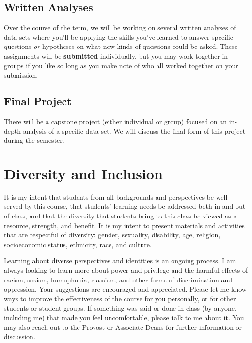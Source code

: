 \documentclass[
]{book}
\begin{document}
\hypertarget{written-analyses}{%
\subsection*{Written Analyses}\label{written-analyses}}

Over the course of the term, we will be working on several written analyses of data sets where you'll be applying the skills you've learned to answer specific questions \emph{or} hypotheses on what new kinds of questions could be asked. These assignments will be \textbf{submitted} individually, but you may work together in groups if you like so long as you make note of who all worked together on your submission.

\hypertarget{final-project}{%
\subsection*{Final Project}\label{final-project}}

There will be a capstone project (either individual or group) focused on an in-depth analysis of a specific data set. We will discuss the final form of this project during the semester.

\hypertarget{diversity-and-inclusion}{%
\section*{Diversity and Inclusion}\label{diversity-and-inclusion}}

It is my intent that students from all backgrounds and perspectives be well served by this course, that students' learning needs be addressed both in and out of class, and that the diversity that students bring to this class be viewed as a resource, strength, and benefit. It is my intent to present materials and activities that are respectful of diversity: gender, sexuality, disability, age, religion, socioeconomic status, ethnicity, race, and culture.

Learning about diverse perspectives and identities is an ongoing process. I am always looking to learn more about power and privilege and the harmful effects of racism, sexism, homophobia, classism, and other forms of discrimination and oppression. Your suggestions are encouraged and appreciated. Please let me know ways to improve the effectiveness of the course for you personally, or for other students or student groups. If something was said or done in class (by anyone, including me) that made you feel uncomfortable, please talk to me about it. You may also reach out to the Provost or Associate Deans for further information or discussion.
\end{document}
